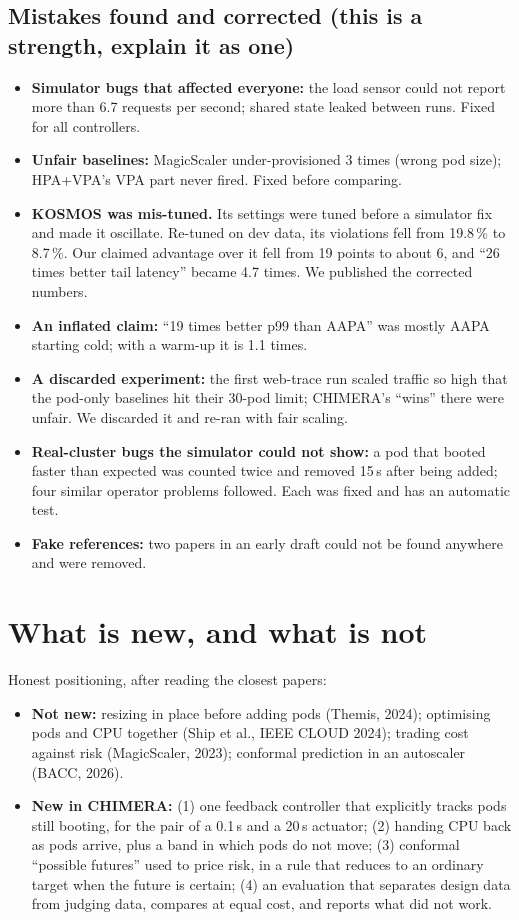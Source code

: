 \documentclass[11pt,a4paper]{article}
\begin{document}
\subsection{Mistakes found and corrected (this is a strength, explain it as one)}
\begin{itemize}
\item \textbf{Simulator bugs that affected everyone:} the load sensor could not report more
than 6.7 requests per second; shared state leaked between runs. Fixed for all
controllers.
\item \textbf{Unfair baselines:} MagicScaler under-provisioned 3 times (wrong pod size);
HPA+VPA's VPA part never fired. Fixed before comparing.
\item \textbf{KOSMOS was mis-tuned.} Its settings were tuned before a simulator fix and made
it oscillate. Re-tuned on dev data, its violations fell from 19.8\,\% to 8.7\,\%. Our
claimed advantage over it fell from 19 points to about 6, and ``26 times better tail
latency'' became 4.7 times. We published the corrected numbers.
\item \textbf{An inflated claim:} ``19 times better p99 than AAPA'' was mostly AAPA
starting cold; with a warm-up it is 1.1 times.
\item \textbf{A discarded experiment:} the first web-trace run scaled traffic so high that
the pod-only baselines hit their 30-pod limit; CHIMERA's ``wins'' there were unfair. We
discarded it and re-ran with fair scaling.
\item \textbf{Real-cluster bugs the simulator could not show:} a pod that booted faster
than expected was counted twice and removed 15\,s after being added; four similar operator
problems followed. Each was fixed and has an automatic test.
\item \textbf{Fake references:} two papers in an early draft could not be found anywhere
and were removed.
\end{itemize}

\section{What is new, and what is not}
Honest positioning, after reading the closest papers:
\begin{itemize}
\item \textbf{Not new:} resizing in place before adding pods (Themis, 2024); optimising
pods and CPU together (Ship et al., IEEE CLOUD 2024); trading cost against risk
(MagicScaler, 2023); conformal prediction in an autoscaler (BACC, 2026).
\item \textbf{New in CHIMERA:} (1) one feedback controller that explicitly tracks pods
still booting, for the pair of a 0.1\,s and a 20\,s actuator; (2) handing CPU back as
pods arrive, plus a band in which pods do not move; (3) conformal ``possible futures'' used
to price risk, in a rule that reduces to an ordinary target when the future is certain;
(4) an evaluation that separates design data from judging data, compares at equal cost,
and reports what did not work.
\end{itemize}
\end{document}

